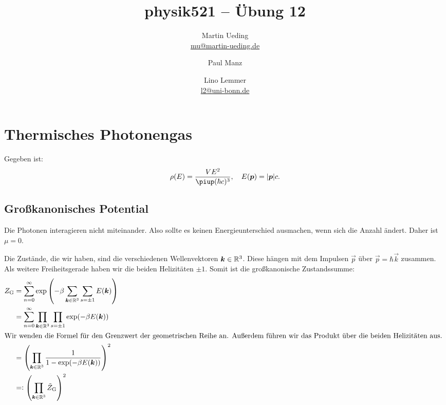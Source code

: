 

\title{physik521 – Übung 12}
\author{
	Martin Ueding \\ \small{\href{mailto:mu@martin-ueding.de}{mu@martin-ueding.de}}
        \and Paul Manz
        \and Lino Lemmer \\ \small{\href{mailto:l2@uni-bonn.de}{l2@uni-bonn.de}}
}

\pagestyle{plain}

\newcommand\kB{k_\text B}
\newcommand\muB{\mu_\text B}
\newcommand\ZG{Z_\text G}



\maketitle

\section{Thermisches Photonengas}

Gegeben ist:
\[
    \rho(E) = \frac{V E^2}{\piup (\hbar c)^3}
    \eqnsep
    E(\vec p) = |\vec p| c.
\]

\subsection{Großkanonisches Potential}

Die Photonen interagieren nicht miteinander. Also sollte es keinen
Energieunterschied ausmachen, wenn sich die Anzahl ändert. Daher ist $\mu = 0$.

Die Zustände, die wir haben, sind die verschiedenen Wellenvektoren $\boldsymbol{k} \in
\mathbb R^3$. Diese hängen mit dem Impulsen $\vec p$ über $\vec p = \hbar \vec k$
zusammen. Als weitere Freiheitsgerade haben wir die beiden Helizitäten $\pm 1$.
Somit ist die großkanonische Zustandssumme:
\begin{align*}
    \ZG
    &= \sum_{n=0}^\infty \exp\del{- \beta \sum_{\vec k \in \R^3} \sum_{s=\pm1} E(\vec k)} \\
    &= \sum_{n=0}^\infty \prod_{\vec k \in \R^3} \prod_{s=\pm1} \exp(- \beta E(\vec k)) \\
    \intertext{%
        Wir wenden die Formel für den Grenzwert der geometrischen Reihe an.
        Außerdem führen wir das Produkt über die beiden Helizitäten aus.
    }
    &= \del{\prod_{\vec k \in \R^3} \frac{1}{1 - \exp(- \beta E(\vec k))}}^2 \\
    &=: \del{\prod_{\vec k \in \R^3} \tilde Z_\text G}^2
\end{align*}
    
